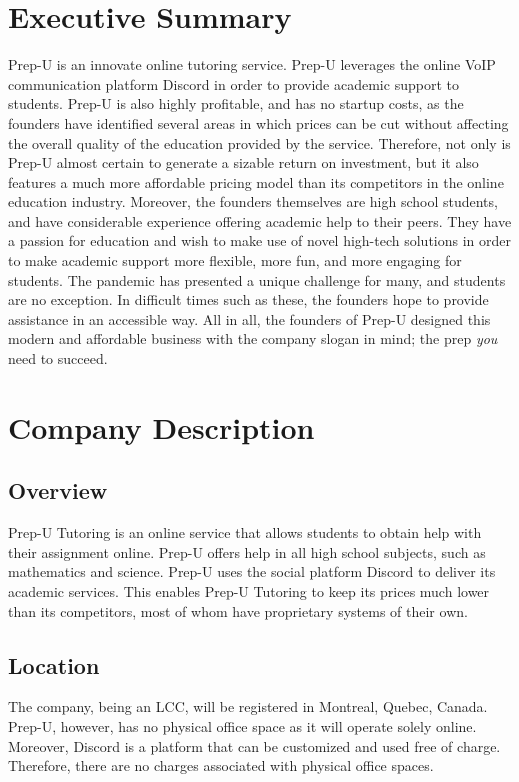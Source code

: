 \documentclass{business}
\begin{document}
    \maketitle
    \tableofcontents
    \newpage
    \section{Executive Summary}
    Prep-U is an innovate online tutoring service. Prep-U leverages the online VoIP communication platform Discord in order to provide academic support to students. Prep-U is also highly profitable, and has no startup costs, as the founders have identified several areas in which prices can be cut without affecting the overall quality of the education provided by the service. Therefore, not only is Prep-U almost certain to generate a sizable return on investment, but it also features a much more affordable pricing model than its competitors in the online education industry. Moreover, the founders themselves are high school students, and have considerable experience offering academic help to their peers. They have a passion for education and wish to make use of novel high-tech solutions in order to make academic support more flexible, more fun, and more engaging for students. The pandemic has presented a unique challenge for many, and students are no exception. In difficult times such as these, the founders hope to provide assistance in an accessible way. All in all, the founders of Prep-U designed this modern and affordable business with the company slogan in mind; the prep \emph{you} need to succeed.
    \section{Company Description}
    \subsection{Overview}
    Prep-U Tutoring is an online service that allows students to obtain help with their assignment online. Prep-U offers help in all high school subjects, such as mathematics and science. Prep-U uses the social platform Discord to deliver its academic services. This enables Prep-U Tutoring to keep its prices much lower than its competitors, most of whom have proprietary systems of their own.
    \subsection{Location}
    The company, being an LCC, will be registered in Montreal, Quebec, Canada. Prep-U, however, has no physical office space as it will operate solely online. Moreover, Discord is a platform that can be customized and used free of charge. Therefore, there are no charges associated with physical office spaces. 
\end{document}
